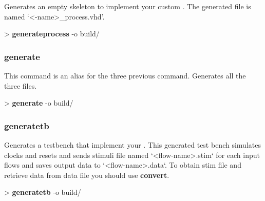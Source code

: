 \documentclass[10pt,a4paper]{article}
\begin{document}
Generates an empty skeleton to implement your custom \kind{}. The generated file is named `<\kind{}-name>\_process.vhd'.\\


\begin{sampletitle}
> \textbf{\tool{} generateprocess} -o build/
\end{sampletitle}

\subsubsection{generate}

This command is an alias for the three previous command. Generates all the three files.\\


\begin{sampletitle}
> \textbf{\tool{} generate} -o build/
\end{sampletitle}

\subsubsection{generatetb}

Generates a testbench that implement your \kind{}. This generated test bench simulates clocks and resets and sends stimuli file named `<flow-name>.stim` for each input flows and saves output data to `<flow-name>.data`. To obtain stim file and retrieve data from data file you should use \textbf{convert}.\\


\begin{sampletitle}
> \textbf{\tool{} generatetb} -o build/
\end{sampletitle}
\end{document}

